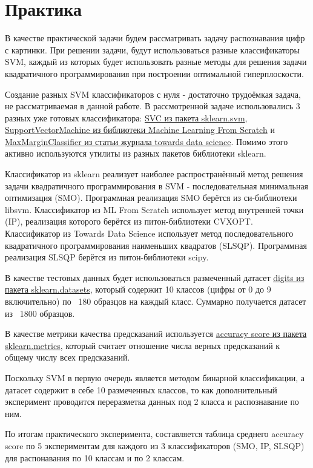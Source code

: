 \documentclass[12pt,a4paper]{article}
\begin{document}
\section{Практика}
В качестве практической задачи будем рассматривать задачу распознавания цифр с картинки. При решении задачи, будут использоваться разные классификаторы SVM, каждый из которых будет использовать разные методы для решения задачи квадратичного программирования при построении оптимальной гиперплоскости.

Создание разных SVM классификаторов с нуля - достаточно трудоёмкая задача, не рассматриваемая в данной работе. В рассмотренной задаче использовались 3 разных уже готовых классификатора: \href{https://scikit-learn.org/stable/modules/generated/sklearn.svm.SVC.html}{SVC из пакета sklearn.svm}, \href{https://github.com/eriklindernoren/ML-From-Scratch}{SupportVectorMachine из библиотеки Machine Learning From Scratch} и \href{https://towardsdatascience.com/support-vector-machines-learning-data-science-step-by-step-f2a569d90f76}{MaxMarginClassifier из статьи журнала towards data science}. Помимо этого активно используются утилиты из разных пакетов библиотеки sklearn.

Классификатор из sklearn реализует наиболее распространённый метод решения задачи квадратичного программирования в SVM - последовательная минимальная оптимизация (SMO). Программная реализация SMO берётся из си-библиотеки libsvm.
Классификатор из ML From Scratch использует метод внутренней точки (IP), реализация которого берётся из питон-библиотеки CVXOPT.
Классификатор из Towards Data Science использует метод последовательного квадратичного программирования наименьших квадратов (SLSQP). Программная реализация SLSQP берётся из питон-библиотеки scipy.

\href{}{}В качестве тестовых данных будет использоваться размеченный датасет \href{https://scikit-learn.org/stable/modules/generated/sklearn.datasets.load_digits.html}{digits из пакета sklearn.datasets}, который содержит 10 классов (цифры от 0 до 9 включительно) по ~180 образцов на каждый класс. Суммарно получается датасет из ~1800 образцов.

В качестве метрики качества предсказаний используется \href{https://scikit-learn.org/stable/modules/generated/sklearn.metrics.accuracy_score.html}{accuracy score из пакета sklearn.metrics}, который считает отношение числа верных предсказаний к общему числу всех предсказаний.

Поскольку SVM в первую очередь является методом бинарной классификации, а датасет содержит в себе 10 размеченных классов, то как дополнительный эксперимент проводится переразметка данных под 2 класса и распознавание по ним.

По итогам практического эксперимента, составляется таблица среднего accuracy score по 5 экспериментам для каждого из 3 классификаторов (SMO, IP, SLSQP) для распонавания по 10 классам и по 2 классам.
\end{document}
